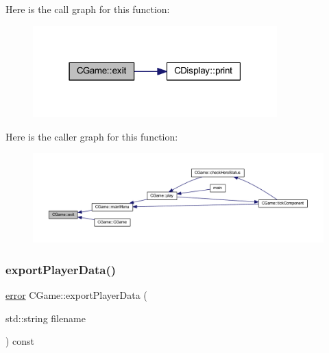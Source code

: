 Here is the call graph for this function\+:\nopagebreak
\begin{figure}[H]
\begin{center}
\leavevmode
\includegraphics[width=267pt]{class_c_game_a7b4409fd50b77ae5743a30bd43f01f61_cgraph}
\end{center}
\end{figure}
Here is the caller graph for this function\+:\nopagebreak
\begin{figure}[H]
\begin{center}
\leavevmode
\includegraphics[width=350pt]{class_c_game_a7b4409fd50b77ae5743a30bd43f01f61_icgraph}
\end{center}
\end{figure}
\mbox{\label{class_c_game_a7d821ce9a0454653bbfde69979155da9}} 
\subsubsection{\texorpdfstring{export\+Player\+Data()}{exportPlayerData()}}
{\footnotesize\ttfamily \mbox{\hyperlink{_errors_list_8h_af10dacfa214e2575bb2e0ee407c242e0}{error}} C\+Game\+::export\+Player\+Data (\begin{DoxyParamCaption}\item[{std\+::string}]{filename }\end{DoxyParamCaption}) const\hspace{0.3cm}{\ttfamily [protected]}}

